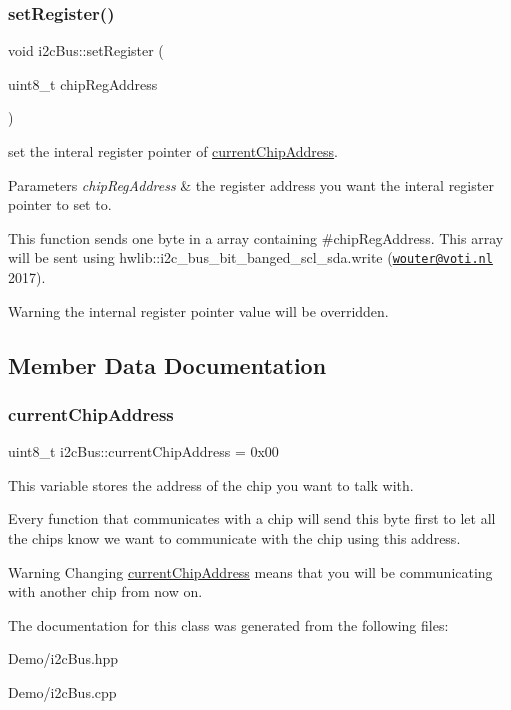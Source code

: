\subsubsection{\texorpdfstring{set\+Register()}{setRegister()}}
{\footnotesize\ttfamily void i2c\+Bus\+::set\+Register (\begin{DoxyParamCaption}\item[{uint8\+\_\+t}]{chip\+Reg\+Address }\end{DoxyParamCaption})}



set the interal register pointer of \mbox{\hyperlink{classi2c_bus_a64ff87527c88619d72ede947d73eac3a}{current\+Chip\+Address}}. 


\begin{DoxyParams}{Parameters}
{\em chip\+Reg\+Address} & the register address you want the interal register pointer to set to.\\
\hline
\end{DoxyParams}
This function sends one byte in a array containing \#chip\+Reg\+Address. This array will be sent using hwlib\+::i2c\+\_\+bus\+\_\+bit\+\_\+banged\+\_\+scl\+\_\+sda.\+write (\href{mailto:wouter@voti.nl}{\tt wouter@voti.\+nl} 2017). \begin{DoxyWarning}{Warning}
the internal register pointer value will be overridden. 
\end{DoxyWarning}


\subsection{Member Data Documentation}
\mbox{\label{classi2c_bus_a64ff87527c88619d72ede947d73eac3a}} 
\subsubsection{\texorpdfstring{current\+Chip\+Address}{currentChipAddress}}
{\footnotesize\ttfamily uint8\+\_\+t i2c\+Bus\+::current\+Chip\+Address = 0x00\hspace{0.3cm}{\ttfamily [private]}}



This variable stores the address of the chip you want to talk with. 

Every function that communicates with a chip will send this byte first to let all the chips know we want to communicate with the chip using this address. \begin{DoxyWarning}{Warning}
Changing \mbox{\hyperlink{classi2c_bus_a64ff87527c88619d72ede947d73eac3a}{current\+Chip\+Address}} means that you will be communicating with another chip from now on. 
\end{DoxyWarning}


The documentation for this class was generated from the following files\+:\begin{DoxyCompactItemize}
\item 
Demo/i2c\+Bus.\+hpp\item 
Demo/i2c\+Bus.\+cpp\end{DoxyCompactItemize}
